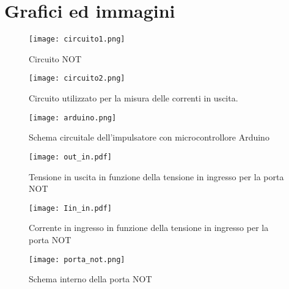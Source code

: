 \section{Grafici ed immagini}
\begin{figure}[h]
	\centering
	\texttt{[image: circuito1.png]}
	\caption{Circuito NOT}
	\label{f:circuito1}
\end{figure}
\begin{figure}[h]
	\centering
	\texttt{[image: circuito2.png]}
	\caption{Circuito utilizzato per la misura delle correnti in uscita.}
           \label{f:circuito2}
\end{figure}

\begin{figure}[h]
	\centering
	\texttt{[image: arduino.png]}
	\caption{Schema circuitale dell'impulsatore con microcontrollore Arduino}
           \label{f:Circuito}
\end{figure}

\begin{figure}[h]
	\centering
	\texttt{[image: out\_in.pdf]}
	\caption{Tensione in uscita in funzione della tensione in ingresso per la porta NOT}
           \label{f:out_in}
\end{figure}
\begin{figure}[h]
	\centering
	\texttt{[image: Iin\_in.pdf]}
	\caption{Corrente in ingresso in funzione della tensione in ingresso per la porta NOT}
           \label{f:Iin_in}
\end{figure}
\begin{figure}[h]
	\centering
	\texttt{[image: porta\_not.png]}
	\caption{Schema interno della porta NOT}
           \label{f:porta_not}
\end{figure}